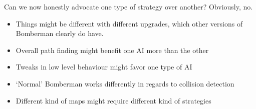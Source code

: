 Can we now honestly advocate one type of strategy over another? Obviously, no.


\begin{itemize}
\item Things might be different with different upgrades, which other versions of Bomberman clearly do have.
\item Overall path finding might benefit one AI more than the other
\item Tweaks in low level behaviour might favor one type of AI
\item `Normal' Bomberman works differently in regards to collision detection
\item Different kind of maps might require different kind of strategies
\end{itemize}
